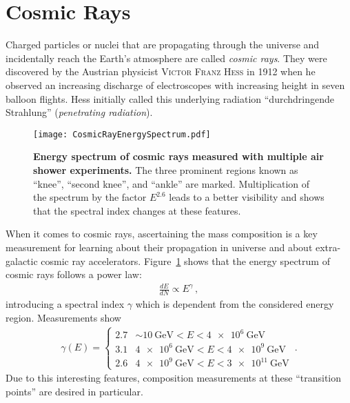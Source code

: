 \section{Cosmic Rays}\label{sec:cosmicrays}

Charged particles or nuclei that are propagating through the universe and incidentally reach the Earth's atmosphere are called \textit{cosmic rays}. They were discovered by the Austrian physicist \textsc{Victor Franz Hess} in 1912 when he observed an increasing discharge of electroscopes with increasing height in seven balloon flights. \cite{cosmicrays:hess} Hess initially called this underlying radiation \enquote{durchdringende Strahlung} (\textit{penetrating radiation}).

\begin{figure}[h]
	\texttt{[image: CosmicRayEnergySpectrum.pdf]}
	\caption[Cosmic ray energy spectrum]{\textbf{Energy spectrum of cosmic rays measured with multiple air shower experiments.} \cite[adapted]{cosmicrays:gaisser} The three prominent regions known as \enquote{knee}, \enquote{second knee}, and \enquote{ankle} are marked. Multiplication of the spectrum by the factor $E^{2.6}$ leads to a better visibility and shows that the spectral index changes at these features.}
	\label{cosmicrays:spectrum}	
\end{figure}

When it comes to cosmic rays, ascertaining the mass composition is a key measurement for learning about their propagation in universe and about extra-galactic cosmic ray accelerators. Figure~\ref{cosmicrays:spectrum} shows that the energy spectrum of cosmic rays follows a power law:
\begin{align}
\frac{dE}{dN}\propto E^\gamma\,,
\end{align}
introducing a spectral index $\gamma$ which is dependent from the considered energy region. Measurements show \cite{cosmicrays:hoerandel, cosmicrays:fowler}
\begin{align}
	\gamma(E)=
	\begin{cases}
		\num{2.7} & \sim\SI{10}{\giga\electronvolt} < E < \SI{4e6}{\giga\electronvolt}\\
		\num{3.1} & \SI{4e6}{\giga\electronvolt} < E < \SI{4e9}{\giga\electronvolt}\\
		\num{2.6} & \SI{4e9}{\giga\electronvolt} < E < \SI{3e11}{\giga\electronvolt}
	\end{cases}\,.
\end{align}
Due to this interesting features, composition measurements at these \enquote{transition points} are desired in particular.

